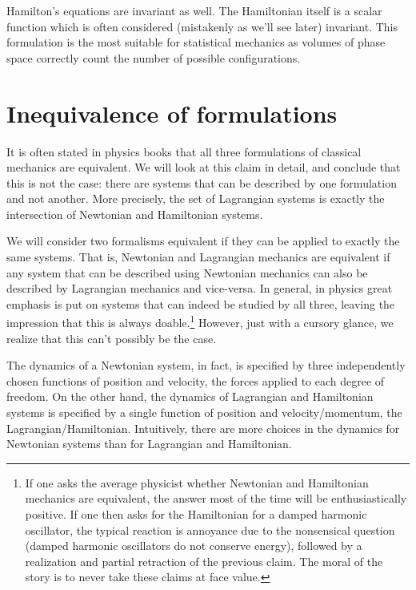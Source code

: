 Hamilton's equations are invariant as well. The Hamiltonian itself is a scalar function which is often considered (mistakenly as we'll see later) invariant. This formulation is the most suitable for statistical mechanics as volumes of phase space correctly count the number of possible configurations.

\section{Inequivalence of formulations}\label{rp-cm-inequivalenceOfFormulations}

It is often stated in physics books that all three formulations of classical mechanics are equivalent. We will look at this claim in detail, and conclude that this is not the case: there are systems that can be described by one formulation and not another. More precisely, the set of Lagrangian systems is exactly the intersection of Newtonian and Hamiltonian systems.

We will consider two formalisms equivalent if they can be applied to exactly the same systems. That is, Newtonian and Lagrangian mechanics are equivalent if any system that can be described using Newtonian mechanics can also be described by Lagrangian mechanics and vice-versa. In general, in physics great emphasis is put on systems that can indeed be studied by all three, leaving the impression that this is always doable.\footnote{If one asks the average physicist whether Newtonian and Hamiltonian mechanics are equivalent, the answer most of the time will be  enthusiastically positive. If one then asks for the Hamiltonian for a damped harmonic oscillator, the typical reaction is annoyance due to the nonsensical question (damped harmonic oscillators do not conserve energy), followed by a realization and partial retraction of the previous claim. The moral of the story is to never take these claims at face value.} However, just with a cursory glance, we realize that this can't possibly be the case.

The dynamics of a Newtonian system, in fact, is specified by three independently chosen functions of position and velocity, the forces applied to each degree of freedom. On the other hand, the dynamics of Lagrangian and Hamiltonian systems is specified by a single function of position and velocity/momentum, the Lagrangian/Hamiltonian. Intuitively, there are more choices in the dynamics for Newtonian systems than for Lagrangian and Hamiltonian.

